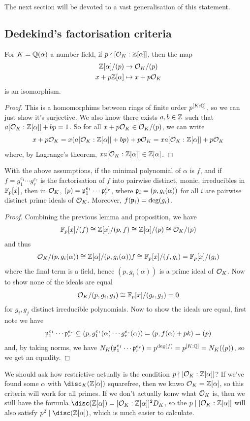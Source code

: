 \documentclass{article}
\begin{document}
The next section will be devoted to a vast generalisation of this statement.

\subsection{Dedekind's factorisation criteria}

\begin{lemma}
    For $K=\mathbb{Q}(\alpha)$ a number field, if $p\nmid [\mathcal{O}_K:\mathbb{Z}[\alpha]]$, then the map \begin{gather*}
        \mathbb{Z}[\alpha]/(p)\rightarrow \mathcal{O}_K/(p)\\
        x + p\mathbb{Z}[\alpha]\mapsto x+p\mathcal{O}_K
    \end{gather*} is an isomorphism.\begin{proof}
        This is a homomorphims between rings of finite order $p^{[K:\mathbb{Q}]}$, so we can just show it's surjective. We also know there exists $a,b\in\mathbb{Z}$ such that $a[\mathcal{O}_K:\mathbb{Z}[\alpha]]+bp=1$. So for all $x+p\mathcal{O}_K\in\mathcal{O}_K/(p)$, we can write \[
        x+p\mathcal{O}_K = x(a[\mathcal{O}_K:\mathbb{Z}[\alpha]]+bp)+p\mathcal{O}_K = xa[\mathcal{O}_K:\mathbb{Z}[\alpha]]+p\mathcal{O}_K
        \] where, by Lagrange's theorem, $xa[\mathcal{O}_K:\mathbb{Z}[\alpha]]\in\mathbb{Z}[\alpha]$.
    \end{proof}
\end{lemma}

\begin{theorem}
    With the above assumptions, if the minimal polynomial of $\alpha$ is $f$, and if $f=g_1^{e_1}\cdots g_r^{e_r}$ is the factorisation of $f$ into pairwise distinct, monic, irreducibles in $\mathbb{F}_p[x]$, then in $\mathcal{O}_K$, $(p)=\mathfrak{p}_1^{e_1}\cdots \mathfrak{p}_r^{e_r}$, where $\mathfrak{p}_i=(p,g_i(\alpha))$ for all $i$ are pairwise distinct prime ideals of $\mathcal{O}_K$. Moreover, $f(\mathfrak{p}_i)=\deg(g_i)$.\begin{proof}
        Combining the previous lemma and proposition, we have \[
        \mathbb{F}_p[x]/(f) \cong \mathbb{Z}[x]/(p,f) \cong \mathbb{Z}[\alpha]/(p)\cong \mathcal{O}_K/(p)
        \]and thus \[
        \mathcal{O}_K/(p,g_i(\alpha))\cong\mathbb{Z}[\alpha]/(p,g_i(\alpha))f\cong \mathbb{F}_p[x]/(f,g_i)=\mathbb{F}_p[x]/(g_i)
        \] where the final term is a field, hence $(p,g_i(\alpha))$ is a prime ideal of $\mathcal{O}_K$. Now to show none of the ideals are equal \[
        \mathcal{O}_K/(p,g_i,g_j) \cong \mathbb{F}_p[x]/(g_i,g_j)=0
        \] for $g_i,g_j$ distinct irreducible polynomials. Now to show the ideals are equal, first note we have \[
        \mathfrak{p}_1^{e_1}\cdots \mathfrak{p}_r^{e_r} \subseteq (p,g_1^{e_1}(\alpha)\cdots g_r^{e_r}(\alpha)) = (p,f(\alpha)+pk)=(p)
        \] and, by taking norms, we have $N_K(\mathfrak{p}_1^{e_1}\cdots \mathfrak{p}_r^{e_r})=p^{\deg(f)}=p^{[K:\mathbb{Q}]}=N_K((p))$, so we get an equality.
    \end{proof}
\end{theorem}
We should ask how restrictive actually is the condition $p\nmid [\mathcal{O}_K:\mathbb{Z}[\alpha]]$? If we've found some $\alpha$ with $\disc_K(\bZ[\alpha])$ squarefree, then we knwo $\mathcal{O}_K=\mathbb{Z}[\alpha]$, so this criteria will work for all primes. If we don't actually konw what $\mathcal{O}_K$ is, then we still have the formula $\disc(\bZ[\alpha])=[\cO_K:\bZ[\alpha]]^2D_K$, so the $p\mid[\mathcal{O}_K:\mathbb{Z}[\alpha]]$ will also satisfy $p^2\mid\disc(\bZ[\alpha])$, which is much easier to calculate.
\end{document}
